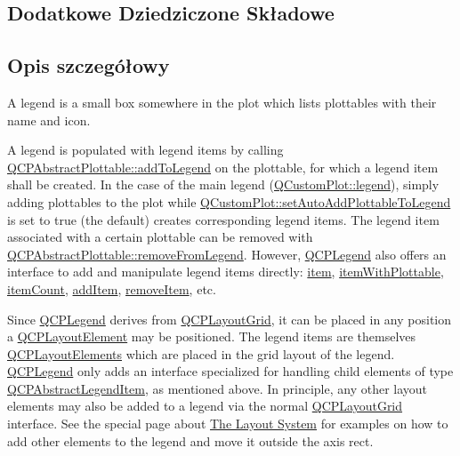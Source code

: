 \subsection*{Dodatkowe Dziedziczone Składowe}


\subsection{Opis szczegółowy}
A legend is a small box somewhere in the plot which lists plottables with their name and icon.

A legend is populated with legend items by calling \hyperlink{class_q_c_p_abstract_plottable_aa64e93cb5b606d8110d2cc0a349bb30f}{Q\+C\+P\+Abstract\+Plottable\+::add\+To\+Legend} on the plottable, for which a legend item shall be created. In the case of the main legend (\hyperlink{class_q_custom_plot_a4eadcd237dc6a09938b68b16877fa6af}{Q\+Custom\+Plot\+::legend}), simply adding plottables to the plot while \hyperlink{class_q_custom_plot_ad8858410c2db47b7104040a3aa61c3fc}{Q\+Custom\+Plot\+::set\+Auto\+Add\+Plottable\+To\+Legend} is set to true (the default) creates corresponding legend items. The legend item associated with a certain plottable can be removed with \hyperlink{class_q_c_p_abstract_plottable_a26d936d11852ea08e6bc0edae3a514a2}{Q\+C\+P\+Abstract\+Plottable\+::remove\+From\+Legend}. However, \hyperlink{class_q_c_p_legend}{Q\+C\+P\+Legend} also offers an interface to add and manipulate legend items directly\+: \hyperlink{class_q_c_p_legend_a454272d7094437beb3278a2294006da5}{item}, \hyperlink{class_q_c_p_legend_a5ee80cf83f65e3b6dd386942ee3cc1ee}{item\+With\+Plottable}, \hyperlink{class_q_c_p_legend_a198228e9cdc78d3a3c306fa6763d0404}{item\+Count}, \hyperlink{class_q_c_p_legend_a3ab274de52d2951faea45a6d975e6b3f}{add\+Item}, \hyperlink{class_q_c_p_legend_ac91595c3eaa746fe6321d2eb952c63bb}{remove\+Item}, etc.

Since \hyperlink{class_q_c_p_legend}{Q\+C\+P\+Legend} derives from \hyperlink{class_q_c_p_layout_grid}{Q\+C\+P\+Layout\+Grid}, it can be placed in any position a \hyperlink{class_q_c_p_layout_element}{Q\+C\+P\+Layout\+Element} may be positioned. The legend items are themselves \hyperlink{class_q_c_p_layout_element}{Q\+C\+P\+Layout\+Elements} which are placed in the grid layout of the legend. \hyperlink{class_q_c_p_legend}{Q\+C\+P\+Legend} only adds an interface specialized for handling child elements of type \hyperlink{class_q_c_p_abstract_legend_item}{Q\+C\+P\+Abstract\+Legend\+Item}, as mentioned above. In principle, any other layout elements may also be added to a legend via the normal \hyperlink{class_q_c_p_layout_grid}{Q\+C\+P\+Layout\+Grid} interface. See the special page about \hyperlink{}{The Layout System} for examples on how to add other elements to the legend and move it outside the axis rect.

